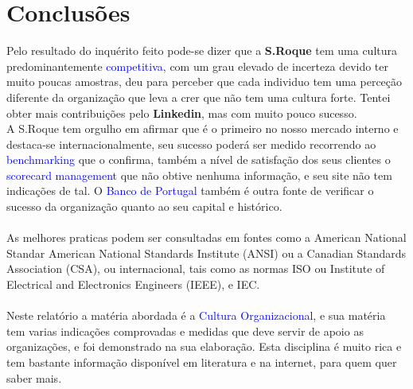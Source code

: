 {\newpage
\section{Conclusões}
\qquad Pelo resultado do inquérito feito pode-se dizer que a \textbf{S.Roque} tem uma cultura predominantemente \textcolor{blue}{competitiva}, com um grau elevado de incerteza devido ter muito poucas amostras, deu para perceber que cada individuo tem uma perceção diferente da organização que leva a crer que não tem uma cultura forte. Tentei obter mais contribuições pelo \textbf{Linkedin}, mas com muito pouco sucesso. \\

A S.Roque tem orgulho em afirmar que é o primeiro no nosso mercado interno e destaca-se internacionalmente, seu sucesso poderá ser medido recorrendo ao \textcolor{blue}{benchmarking} que o confirma, também a nível de satisfação dos seus clientes o \textcolor{blue}{scorecard management} que não obtive nenhuma informação, e seu site não tem indicações de tal. O \textcolor{blue}{Banco de Portugal} também é outra fonte de verificar o sucesso da organização quanto ao seu capital e histórico. \\
\\
As melhores praticas podem ser consultadas em fontes como a American National Standar American National Standards Institute (ANSI) ou a Canadian Standards Association (CSA), ou internacional, tais como as normas ISO ou Institute of Electrical and Electronics Engineers (IEEE), e IEC. \\
\\
Neste relatório a matéria abordada é a \textcolor{blue}{Cultura Organizacional}, e sua matéria tem varias indicações comprovadas e medidas que deve servir de apoio as organizações, e foi demonstrado na sua elaboração. Esta disciplina é muito rica e tem bastante informação disponível em literatura e na internet, para quem quer saber mais.





}
